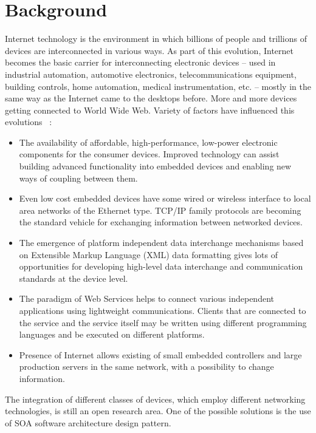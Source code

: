 \newpage
\section{Background}

Internet technology is the environment in which billions of people and trillions of
devices are interconnected in various ways.
As part of this evolution, Internet becomes the basic carrier
for interconnecting electronic devices – used in industrial
automation, automotive electronics, telecommunications
equipment, building controls, home automation, medical
instrumentation, etc. – mostly in the same way as the Internet came
to the desktops before. More and more devices getting connected to World Wide
Web. Variety of factors have influenced  this evolutions ~\cite{4221180}:
\begin{itemize}
\item The availability of affordable, high-performance, low-power
electronic components for the consumer devices. Improved technology can assist
building  advanced functionality into embedded devices and enabling new ways of
coupling between them.
\item Even low cost embedded devices have some wired or wireless interface to local area
networks of the Ethernet type. TCP/IP family protocols are becoming the standard
vehicle for exchanging information between networked devices.
\item The emergence of platform independent data interchange mechanisms based on
Extensible Markup Language (XML) data formatting gives lots of opportunities for developing high-level data interchange and
communication standards at the device level.
\item The paradigm of Web Services  helps to connect various
independent applications using lightweight communications. Clients that are
connected to the service and the service itself may be written using different
programming languages and be executed on different platforms.
\item Presence of Internet allows existing of small embedded controllers and
large production servers in the same network, with a possibility to change
information.
\end{itemize}


The integration of different classes of devices, which employ different
networking technologies, is still an open research area. One of the possible
solutions is the use of SOA software architecture design pattern.



